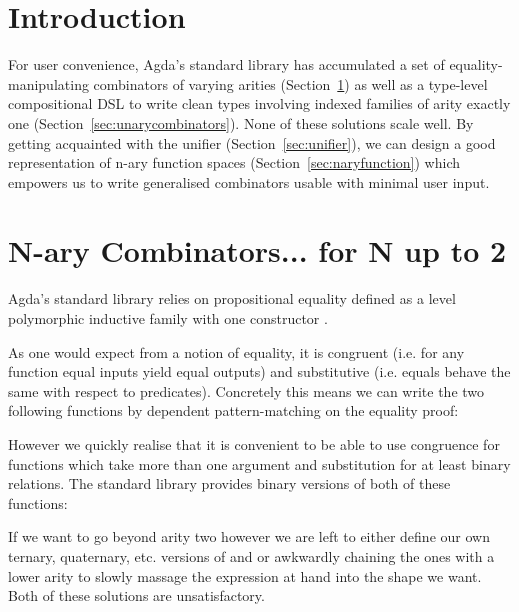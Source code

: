 \section*{Introduction}

For user convenience, Agda's standard library has accumulated a set of
equality-manipulating combinators of varying arities (Section~\ref{sec:nary2})
as well as a type-level compositional DSL to write clean types involving
indexed families of arity exactly one (Section~\ref{sec:unarycombinators}).
None of these solutions scale well. By getting acquainted with the unifier
(Section~\ref{sec:unifier}), we can design a good representation of n-ary
function spaces (Section~\ref{sec:naryfunction}) which empowers us to write
generalised combinators usable with minimal user input.

\section{N-ary Combinators... for N up to 2}\label{sec:nary2}

Agda's standard library relies on propositional equality defined as
a level polymorphic inductive family with one constructor .


As one would expect from a notion of equality, it is congruent (i.e.
for any function equal inputs yield equal outputs) and substitutive
(i.e. equals behave the same with respect to predicates). Concretely
this means we can write the two following functions by dependent
pattern-matching on the equality proof:


However we quickly realise that it is convenient to be able to use
congruence for functions which take more than one argument and
substitution for at least binary relations. The standard library
provides binary versions of both of these functions:


If we want to go beyond arity two however we are left to either define
our own ternary, quaternary, etc. versions of  and 
or awkwardly chaining the ones with a lower arity to slowly massage
the expression at hand into the shape we want. Both of these solutions
are unsatisfactory.

